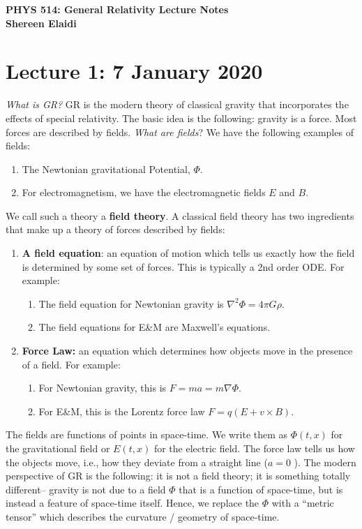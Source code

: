 \documentclass[11pt]{article}
\begin{document}
\begin{center}
	\textbf{PHYS 514: General Relativity Lecture Notes} \\
	\textbf{Shereen Elaidi}
\end{center}

\section*{Lecture 1: 7 January 2020}
\emph{What is GR?} GR is the modern theory of classical gravity that incorporates the effects of special relativity. The basic idea is the following: gravity is a force. Most forces are described by fields. \emph{What are fields}? We have the following examples of fields: 
\begin{enumerate}[noitemsep]
	\item The Newtonian gravitational Potential, \( \Phi \). 
	\item For electromagnetism, we have the electromagnetic fields \(  E \) and \( B \). 
\end{enumerate}
We call such a theory a \textbf{field theory}. A classical field theory has two ingredients that make up a theory of forces described by fields: 
\begin{enumerate}[noitemsep]
	\item \textbf{A field equation}: an equation of motion which tells us exactly how the field is determined by some set of forces. This is typically a 2nd order ODE. For example: 
	\begin{enumerate}[noitemsep]
		\item The field equation for Newtonian gravity is \( \nabla^2 \Phi = 4 \pi G \rho \). 
		\item The field equations for E\&M are Maxwell's equations. 
	\end{enumerate}
	\item \textbf{Force Law:} an equation which determines how objects move in the presence of a field. For example: 
	\begin{enumerate}[noitemsep]
		\item For Newtonian gravity, this is \( F = ma = m \nabla \Phi \).
		\item For E\&M, this is the Lorentz force law \( F = q(E + v \times B ) \).
	\end{enumerate}
\end{enumerate}
The fields are functions of points in space-time. We write them as \( \Phi(t,x) \) for the gravitational field or \( E(t,x) \) for the electric field. The force law tells us how the objects move, i.e., how they deviate from a straight line (\( a = 0 \) ). The modern perspective of GR is the following: it is not a field theory; it is something totally different-- gravity is not due to a field \( \Phi \) that is a function of space-time, but is instead a feature of space-time itself. Hence, we replace the \( \Phi \) with a ``metric tensor'' which describes the curvature / geometry of space-time. 
\end{document}
